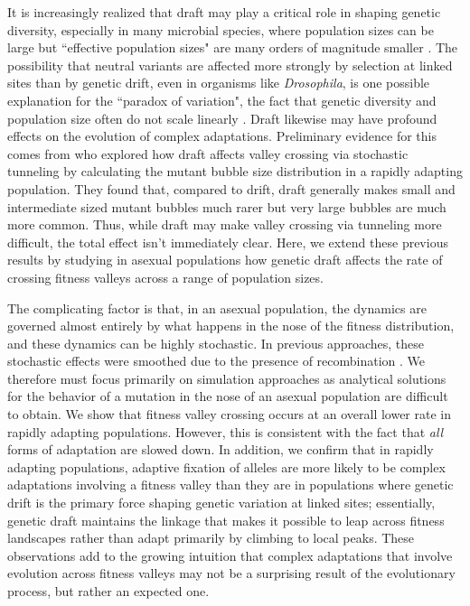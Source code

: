 \documentclass[rmp]{revtex4}
\begin{document}
\begin{spacing}{1.5}
It is increasingly realized that draft may play a critical role in shaping genetic diversity, especially in many microbial species, where population sizes can be large but ``effective population sizes" are many orders of magnitude smaller \citep{masel_2011}.
The possibility that neutral variants are affected more strongly by selection at linked sites than by genetic drift, even in organisms like \emph{Drosophila}, is one possible explanation for the ``paradox of variation", the fact that genetic diversity and population size often do not scale linearly \citep{gillespie_2000, gillespie_2001, neher_kessinger_2013, corbett-detig_2015}.
Draft likewise may have profound effects on the evolution of complex adaptations. Preliminary evidence for this comes from
\citet{neher_shraiman_2011} who explored how draft affects valley crossing via stochastic tunneling by calculating the mutant bubble size distribution in a rapidly adapting population.
They found that, compared to drift, draft generally makes small and intermediate sized mutant bubbles much rarer but very large bubbles are much more common. Thus, while draft may make valley crossing via tunneling more difficult, the total effect isn't immediately clear.
Here, we extend these previous results by studying in asexual populations how genetic draft affects the rate of crossing fitness valleys across a range of population sizes.

The complicating factor is that, in an asexual population, the dynamics are governed almost entirely by what happens in the nose of the fitness distribution, and these dynamics can be highly stochastic. In previous approaches, these stochastic effects were smoothed due to the presence of recombination \citep{neher_shraiman_2011}.
We therefore must focus primarily on simulation approaches as analytical solutions for the behavior of a mutation in the nose of an asexual population are difficult to obtain.
We show that fitness valley crossing occurs at an overall lower rate in rapidly adapting populations.
However, this is consistent with the fact that \emph{all} forms of adaptation are slowed down.
In addition, we confirm that in rapidly adapting populations, adaptive fixation of alleles are more likely to be complex adaptations involving a fitness valley than they are in populations where genetic drift is the primary force shaping genetic variation at linked sites; essentially, genetic draft maintains the linkage that makes it possible to leap across fitness landscapes rather than adapt primarily by climbing to local peaks.
These observations add to the growing intuition that complex adaptations that involve evolution across fitness valleys may not be a surprising result of the evolutionary process, but rather an expected one.


\end{spacing}
\end{document}
